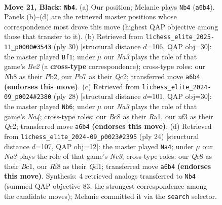 \documentclass[11pt]{article}
\begin{document}
\clearpage

\begin{figure}[p]\centering
\begin{subfigure}{0.46\textwidth}\centering
\resizebox{\linewidth}{!}{%
\newchessgame
\chessboard[
  setfen={rnb1qrk1/1p5p/n1p1p3/p2p1p2/3P1P2/2NQ1NP1/PPP2K1P/3R1B1R b - - 0 21},
  showmover=false,
  pgfstyle=straightmove, color=movearrow, markmove={a6-b4}
]}
\caption{}
\end{subfigure}\hfill
\begin{subfigure}{0.46\textwidth}\centering
\resizebox{\linewidth}{!}{%
\newchessgame
\chessboard[
  setfen={r1br2k1/1pp1qpp1/2n4p/p3p3/P3Pn2/2P1NN1P/1PQ1BPP1/R3R1K1 w - - 1 16},
  showmover=false,
  pgfstyle=straightmove, color=movearrow, markmove={e2-f1}
]}
\caption{}
\end{subfigure}
\\[4pt]
\begin{subfigure}{0.46\textwidth}\centering
\resizebox{\linewidth}{!}{%
\newchessgame
\chessboard[
  setfen={r1b1r1k1/1p2qpp1/2p2n1p/p1n1p3/N1P5/1P3NP1/P1Q1PPBP/R2R2K1 w - - 2 15},
  showmover=false,
  pgfstyle=straightmove, color=movearrow, markmove={a4-b6}
]}
\caption{}
\end{subfigure}\hfill
\begin{subfigure}{0.46\textwidth}\centering
\resizebox{\linewidth}{!}{%
\newchessgame
\chessboard[
  setfen={r3kb1r/pp1n1ppp/2q1p3/3pPn2/3P4/2N1RN2/PP3PPP/R1BQ2K1 w kq - 7 13},
  showmover=false,
  pgfstyle=straightmove, color=movearrow, markmove={c3-a4}
]}
\caption{}
\end{subfigure}
\caption{\textbf{Move 21, Black: \texttt{Nb4}.} (a) Our position; Melanie plays \texttt{Nb4} (\texttt{a6b4}). Panels (b)--(d) are the retrieved master positions whose correspondence most drove this move (highest QAP objective among those that transfer to it). (b) Retrieved from \texttt{lichess\_elite\_2025-11\_p0000\#3543} (ply 30) [structural distance $d$=106, QAP obj=30]: the master played \texttt{Bf1}; under $\mu$ our \emph{Na3} plays the role of that game's \emph{Be2} (a \textbf{cross-type} correspondence); cross-type roles: our \emph{N}b8 as their \emph{P}b2, our \emph{P}b7 as their \emph{Q}c2; transferred move \texttt{a6b4} \textbf{(endorses this move)}. (c) Retrieved from \texttt{lichess\_elite\_2024-09\_p0024\#2380} (ply 28) [structural distance $d$=101, QAP obj=30]: the master played \texttt{Nb6}; under $\mu$ our \emph{Na3} plays the role of that game's \emph{Na4}; cross-type roles: our \emph{B}c8 as their \emph{R}a1, our \emph{n}f3 as their \emph{Q}c2; transferred move \texttt{a6b4} \textbf{(endorses this move)}. (d) Retrieved from \texttt{lichess\_elite\_2024-09\_p0023\#2395} (ply 24) [structural distance $d$=107, QAP obj=12]: the master played \texttt{Na4}; under $\mu$ our \emph{Na3} plays the role of that game's \emph{Nc3}; cross-type roles: our \emph{Q}e8 as their \emph{B}c1, our \emph{R}f8 as their \emph{Q}d1; transferred move \texttt{a6b4} \textbf{(endorses this move)}. Synthesis: 4 retrieved analogs transferred to \texttt{Nb4} (summed QAP objective 83, the strongest correspondence among the candidate moves); Melanie committed it via the \texttt{search} selector.}
\label{fig:thought-m41}
\end{figure}
\end{document}
